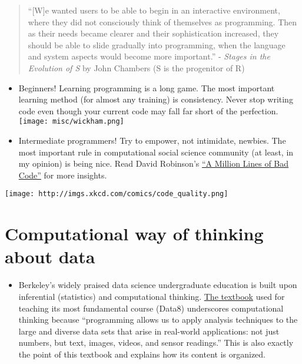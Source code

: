 \documentclass[
]{book}
\providecommand{\tightlist}{%
  \setlength{\itemsep}{0pt}\setlength{\parskip}{0pt}}
\begin{document}
\begin{quote}
``{[}W{]}e wanted users to be able to begin in an interactive environment, where they did not consciously think of themselves as programming. Then as their needs became clearer and their sophistication increased, they should be able to slide gradually into programming, when the language and system aspects would become more important.'' - \emph{Stages in the Evolution of S} by John Chambers (S is the progenitor of R)
\end{quote}

\begin{itemize}
\item
  Beginners! Learning programming is a long game. The most important learning method (for almost any training) is consistency. Never stop writing code even though your current code may fall far short of the perfection.
  \texttt{[image: misc/wickham.png]}
\item
  Intermediate programmers! Try to empower, not intimidate, newbies. The most important rule in computational social science community (at least, in my opinion) is being nice. Read David Robinson's \href{http://varianceexplained.org/programming/bad-code/}{``A Million Lines of Bad Code''} for more insights.
\end{itemize}

\texttt{[image: http://imgs.xkcd.com/comics/code\_quality.png]}

\hypertarget{computational-way-of-thinking-about-data}{%
\section{Computational way of thinking about data}\label{computational-way-of-thinking-about-data}}

\begin{itemize}
\tightlist
\item
  Berkeley's widely praised data science undergraduate education is built upon inferential (statistics) and computational thinking. \href{https://www.inferentialthinking.com/chapters/intro}{The textbook} used for teaching its most fundamental course (Data8) underscores computational thinking because ``programming allows us to apply analysis techniques to the large and diverse data sets that arise in real-world applications: not just numbers, but text, images, videos, and sensor readings.'' This is also exactly the point of this textbook and explains how its content is organized.
\end{itemize}
\end{document}
